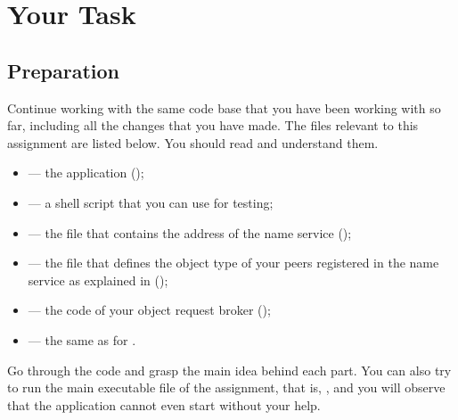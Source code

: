 \documentclass[a4paper]{article}
\begin{document}
\section{Your Task} 
\subsection{Preparation}
Continue working with the same code base that you have been working with so far,
including all the changes that you have made. The files relevant to this
assignment are listed below. You should read and understand them.
\begin{itemize}

  \item {} --- the  application (\leave);

  \item {} --- a shell script that you can use for testing;

  \item {} --- the file that
  contains the address of the name service (\leave);

  \item {} --- the file that defines the
  object type of your peers registered in the name service as explained in
   (\fix);

  \item {} --- the code of your object request
  broker (\fix);

  \item {} --- the same as for .

\end{itemize}
Go through the code and grasp the main idea behind each part. You can also try
to run the main executable file of the assignment, that is, ,
and you will observe that the application cannot even start without your help.
\end{document}
